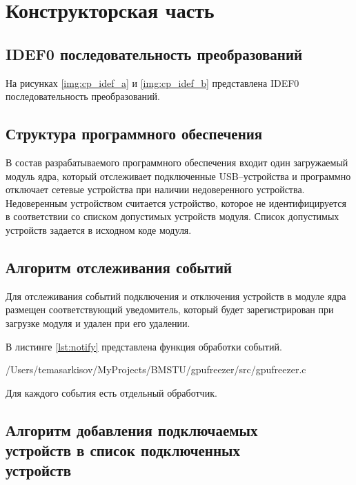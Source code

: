 \chapter{Конструкторская часть}

\section{IDEF0 последовательность преобразований}

На рисунках \ref{img:cp_idef_a} и \ref{img:cp_idef_b} представлена IDEF0 последовательность преобразований.



\section{Структура программного обеспечения}

В состав разрабатываемого программного обеспечения входит один загружаемый модуль ядра, который отслеживает подключенные USB--устройства и программно отключает сетевые устройства при наличии недоверенного устройства. Недоверенным устройством считается устройство, которое не идентифицируется в соответствии со списком допустимых устройств модуля. Список допустимых устройств задается в исходном коде модуля.

\section{Алгоритм отслеживания событий}

Для отслеживания событий подключения и отключения устройств в модуле ядра размещен соответствующий уведомитель, который будет зарегистрирован при загрузке модуля и удален при его удалении.

В листинге \ref{lst:notify} представлена функция обработки событий.

\begin{lstinputlisting}[
	caption={Обработка событий},
	label={lst:notify},
	style={c},
	linerange={180-202},
	]{/Users/temasarkisov/MyProjects/BMSTU/gpufreezer/src/gpufreezer.c}
\end{lstinputlisting}

Для каждого события есть отдельный обработчик.

\section{Алгоритм добавления подключаемых \\устройств в список подключенных\\ устройств}

